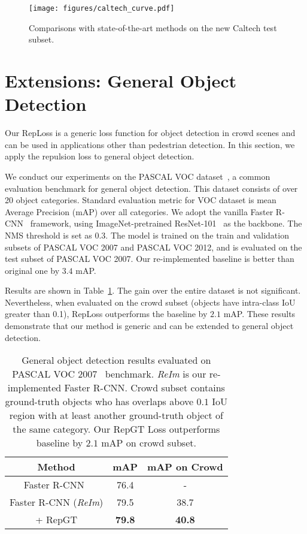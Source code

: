 \documentclass[10pt,twocolumn,letterpaper]{article}
\begin{document}
\begin{figure}[!t]
\centering
\texttt{[image: figures/caltech\_curve.pdf]}
\caption{Comparisons with state-of-the-art methods on the new Caltech test subset.}
\vspace{-0.6cm}
\label{fig:caltech_curve}
\end{figure}


\section{Extensions: General Object Detection}
Our RepLoss is a generic loss function for object detection in crowd scenes and can be used in applications other than pedestrian detection. In this section, we apply the repulsion loss to general object detection.

We conduct our experiments on the PASCAL VOC dataset~\cite{everingham2010pascal}, a common evaluation benchmark for general object detection. This dataset consists of over 20 object categories. Standard evaluation metric for VOC dataset is mean Average Precision (mAP) over all categories. We adopt the vanilla Faster R-CNN~\cite{NIPS2015_5638} framework, using ImageNet-pretrained ResNet-101~\cite{he2016deep} as the backbone. The NMS threshold is set as $0.3$. The model is trained on the train and validation subsets of PASCAL VOC 2007 and PASCAL VOC 2012, and is evaluated on the test subset of PASCAL VOC 2007. Our re-implemented baseline is better than original one by $3.4$ mAP.

Results are shown in Table~\ref{tab:voc}. The gain over the entire dataset is not significant. Nevertheless, when evaluated on the crowd subset (objects have intra-class IoU greater than 0.1), RepLoss outperforms the baseline by $2.1$ mAP. These results demonstrate that our method is generic and can be extended to general object detection.

\begin{table}[!tbp]
\begin{center}
\setlength{\tabcolsep}{5pt}
\begin{tabular}{c|c|c}
\toprule[1pt]
Method & mAP & mAP on Crowd \\
\hline
Faster R-CNN~\cite{he2016deep} & 76.4 & - \\
\hline 
Faster R-CNN (\textit{ReIm}) & 79.5 & 38.7 \\
+ RepGT & {\bf 79.8} & {\bf 40.8} \\
\bottomrule[1pt]
\end{tabular}
\end{center}
\caption{General object detection results evaluated on PASCAL VOC 2007~\cite{everingham2010pascal} benchmark. {\it ReIm} is our re-implemented Faster R-CNN. Crowd subset contains ground-truth objects who has overlaps above $0.1$ IoU region with at least another ground-truth object of the same category. Our RepGT Loss outperforms baseline by $2.1$ mAP on crowd subset.}
\vspace{-0.3cm}
\label{tab:voc}
\end{table}
\end{document}
